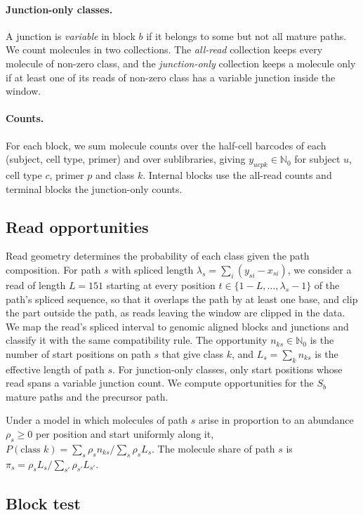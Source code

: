 \documentclass[11pt]{article}
\begin{document}
\paragraph{Junction-only classes.} A junction is \emph{variable} in block $b$ if it belongs to some but not all mature paths. We count molecules in two collections. The \emph{all-read} collection keeps every molecule of non-zero class, and the \emph{junction-only} collection keeps a molecule only if at least one of its reads of non-zero class has a variable junction inside the window.

\paragraph{Counts.} For each block, we sum molecule counts over the half-cell barcodes of each (subject, cell type, primer) and over sublibraries, giving $y_{ucpk}\in\mathbb N_0$ for subject $u$, cell type $c$, primer $p$ and class $k$. Internal blocks use the all-read counts and terminal blocks the junction-only counts.

\subsection{Read opportunities}

Read geometry determines the probability of each class given the path composition. For path $s$ with spliced length $\lambda_s=\sum_i(y_{si}-x_{si})$, we consider a read of length $L=151$ starting at every position $t\in\{1-L,\ldots,\lambda_s-1\}$ of the path's spliced sequence, so that it overlaps the path by at least one base, and clip the part outside the path, as reads leaving the window are clipped in the data. We map the read's spliced interval to genomic aligned blocks and junctions and classify it with the same compatibility rule. The opportunity $n_{ks}\in\mathbb N_0$ is the number of start positions on path $s$ that give class $k$, and $L_s=\sum_kn_{ks}$ is the effective length of path $s$. For junction-only classes, only start positions whose read spans a variable junction count. We compute opportunities for the $S_b$ mature paths and the precursor path.

Under a model in which molecules of path $s$ arise in proportion to an abundance $\rho_s\ge0$ per position and start uniformly along it, $P(\text{class }k)=\sum_s\rho_sn_{ks}/\sum_s\rho_sL_s$. The molecule share of path $s$ is $\pi_s=\rho_sL_s/\sum_{s'}\rho_{s'}L_{s'}$.

\subsection{Block test}
\label{sec:block}
\end{document}
